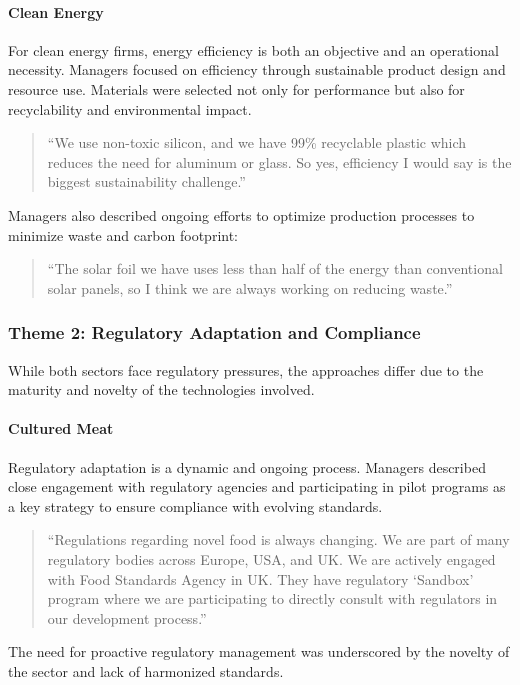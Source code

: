 \paragraph{Clean Energy}
For clean energy firms, energy efficiency is both an objective and an operational necessity. Managers focused on efficiency through sustainable product design and resource use. Materials were selected not only for performance but also for recyclability and environmental impact.
\begin{quote}
	“We use non-toxic silicon, and we have 99\% recyclable plastic which reduces the need for aluminum or glass. So yes, efficiency I would say is the biggest sustainability challenge.”
\end{quote}
Managers also described ongoing efforts to optimize production processes to minimize waste and carbon footprint:
\begin{quote}
	“The solar foil we have uses less than half of the energy than conventional solar panels, so I think we are always working on reducing waste.”
\end{quote}

\subsubsection{Theme 2: Regulatory Adaptation and Compliance}
While both sectors face regulatory pressures, the approaches differ due to the maturity and novelty of the technologies involved.

\paragraph{Cultured Meat}
Regulatory adaptation is a dynamic and ongoing process. Managers described close engagement with regulatory agencies and participating in pilot programs as a key strategy to ensure compliance with evolving standards.
\begin{quote}
	“Regulations regarding novel food is always changing. We are part of many regulatory bodies across Europe, USA, and UK. We are actively engaged with Food Standards Agency in UK. They have regulatory ‘Sandbox’ program where we are participating to directly consult with regulators in our development process.”
\end{quote}
The need for proactive regulatory management was underscored by the novelty of the sector and lack of harmonized standards.

